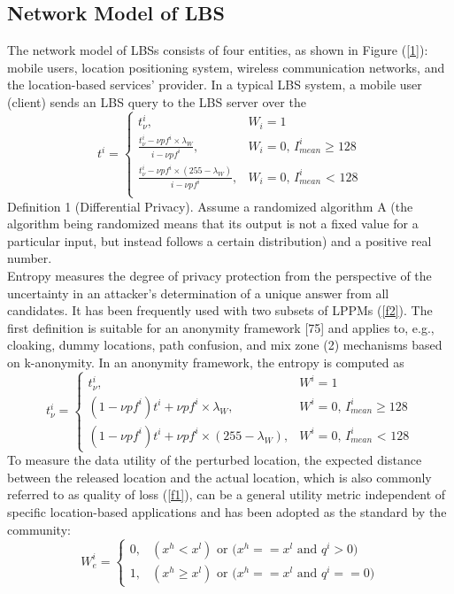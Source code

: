 \documentclass{acmart}
\begin{document}
\subsection{Network Model of LBS}
The network model of LBSs consists of four entities, as shown in Figure (\ref{1}): mobile users, location positioning system, wireless communication networks, and the location-based services’ provider. In a typical LBS system, a mobile user (client) sends an LBS query to the LBS server over the
\begin{equation}
\label{f1}
    t^i = 
    \begin{cases}
    t^i_{\nu}, &\text{$W_i=1$}\\ 
    \frac{t^i_\nu-\nu p f^i \times \lambda_W}{i - \nu p f^i}, &\text{$W_i=0$, $I^i_{mean} \ge 128$}\\
    \frac{t^i_\nu-\nu p f^i \times (255-\lambda_W)}{i - \nu p f^i}, &\text{$W_i=0$, $I^i_{mean}$ < 128}\\
    \end{cases}
\end{equation}
Definition 1 (Differential Privacy). Assume a randomized algorithm A (the algorithm being randomized means that its output is not a fixed value for a particular input, but instead follows a certain distribution) and a positive real number.
\\
Entropy measures the degree of privacy protection from the perspective of the uncertainty in an attacker’s determination of a unique answer from all candidates. It has been frequently used with two subsets of LPPMs (\ref{f2}). The first definition is suitable for an anonymity framework [75] and applies to, e.g., cloaking, dummy locations, path confusion, and mix zone (2) mechanisms based on k-anonymity. In an anonymity framework, the entropy is computed as
\begin{equation}
\label{f2}
    t^i_\nu = 
    \begin{cases}
    t^i_\nu, &\text{$W^i=1$}\\
    {(1-\nu p f^i)t^i+\nu p f^i\times \lambda_W}, &\text{$W^i=0$, $I^i_{mean} \ge 128$}\\
    {(1-\nu p f^i)t^i+\nu p f^i\times(255 -\lambda_W)}, &\text{$W^i=0$, $I^i_{mean}$ < 128}
    \end{cases}
\end{equation}
To measure the data utility of the perturbed location, the expected distance between the released location and the actual location, which is also commonly referred to as quality of loss (\ref{f1}), can be a general utility metric independent of specific location-based applications and has been adopted as the standard by the community:
\begin{equation}
\label{f3}
    W^i_e = 
    \begin{cases}
    0, &\text{$(x^h<x^l)$ or $(x^h == x^l$ and $q^i > 0)$}\\
    1, &\text{$(x^h \ge x^l)$ or $(x^h==x^l$ and $q^i == 0)$}
    \end{cases}
\end{equation}
\end{document}
